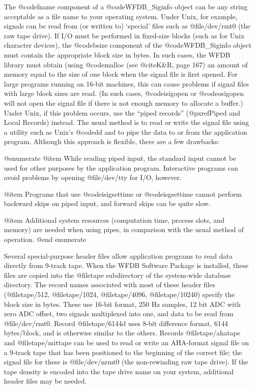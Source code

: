 {{{{{{{{{{The @code{fname} component of a @code{WFDB_Siginfo} object can be any
string acceptable as a file name to your operating system.  Under Unix,
for example, signals can be read from (or written to) `special' files
such as @file{/dev/rmt0} (the raw tape drive).  If I/O must be performed
in fixed-size blocks (such as for Unix character devices), the
@code{bsize} component of the @code{WFDB_Siginfo} object must contain the
appropriate block size in bytes.  In such cases, the WFDB library must
obtain (using @code{malloc} (see @cite{K&R}, page 167) an amount of
memory equal to the size of one block when the signal file is first
opened.  For large programs running on 16-bit machines, this can cause
problems if signal files with large block sizes are read.  (In such
cases, @code{isigopen} or @code{osigopen} will not open the signal file
if there is not enough memory to allocate a buffer.)  Under Unix, if
this problem occurs, use the ``piped records'' (@pxref{Piped and Local
Records}) instead.  The usual method is to read or write the signal file
using a utility such as Unix's @code{dd} and to pipe the data to or from
the application program.  Although this approach is flexible, there are
a few drawbacks:

@enumerate
@item
While reading piped input, the standard input cannot be used for other
purposes by the application program.  Interactive programs can avoid
problems by opening @file{/dev/tty} for I/O, however.

@item
Programs that use @code{isigsettime} or @code{isgsettime} cannot perform
backward skips on piped input, and forward skips can be quite slow.

@item
Additional system resources (computation time, process slots, and
memory) are needed when using pipes, in comparison with the usual
method of operation.
@end enumerate

Several special-purpose header files allow application programs to read data
directly from 9-track tape.  When the WFDB Software Package is installed, these
files are copied into the @file{tape} subdirectory of the system-wide database
directory.  The record names associated with most of these header files
(@file{tape/512}, @file{tape/1024}, @file{tape/4096}, @file{tape/10240})
specify the block size in bytes.  These use 16-bit format, 250 Hz samples, 12
bit ADC with zero ADC offset, two signals multiplexed into one, and data to be
read from @file{/dev/rmt0}.  Record @file{tape/6144d} uses 8-bit difference
format, 6144 bytes/block, and is otherwise similar to the others.  Records
@file{tape/ahatape} and @file{tape/mittape} can be used to read or write an
AHA-format signal file on a 9-track tape that has been positioned to the
beginning of the correct file; the signal file for these is @file{/dev/nrmt0}
(the non-rewinding raw tape drive).  If the tape density is encoded into the
tape drive name on your system, additional header files may be needed.

}}}}}}}}}}
